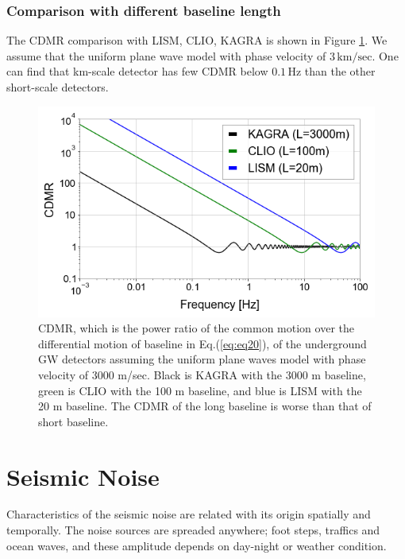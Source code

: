 \subsubsection{Comparison with different baseline length}
The CDMR comparison with LISM, CLIO, KAGRA is shown in Figure \ref{img:img301}. We assume that the uniform plane wave model with phase velocity of $3\,\mathrm{km/sec}$. One can find that km-scale detector has few CDMR below $0.1\,\mathrm{Hz}$ than the other short-scale detectors. 



\begin{figure}[p]
  \begin{center}
    \centering
    \includegraphics[width=12cm]{./img_chap3/img329.png}
    \caption{CDMR, which is the power ratio of the common motion over the differential motion of baseline in Eq.(\ref{eq:eq20}), of the underground GW detectors assuming the uniform plane waves model with phase velocity of 3000 m/sec. Black is KAGRA with the 3000 m baseline, green is CLIO with the 100 m baseline, and blue is LISM with the 20 m baseline. The CDMR of the long baseline is worse than that of short baseline.}\label{img:img301}
    \centering      
  \end{center}
\end{figure}


\newpage
\section{Seismic Noise}\label{sec:32}
Characteristics of the seismic noise are related with its origin spatially and temporally. The noise sources are spreaded anywhere; foot steps, traffics and ocean waves, and these amplitude depends on day-night or weather condition.

